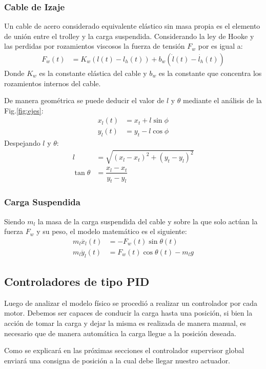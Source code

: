 \documentclass[journal]{IEEEtran}
\begin{document}
\subsubsection{Cable de Izaje}
Un cable de acero considerado equivalente elástico sin masa
propia es el elemento de unión entre el trolley y la carga
suspendida. Considerando la ley de Hooke y 
las perdidas por rozamientos viscosos la fuerza de tensión 
$F_w$ por es igual a:
\begin{align}
    F_w(t) &= K_w (l(t)-l_h(t)) + b_w(\dot{l}(t)-\dot{l_h}(t))
\end{align}
Donde $K_w$ es la constante elástica del cable y $b_w$ es la
constante que concentra los rozamientos internos del cable.

De manera geométrica se puede deducir el valor de $l$ y $\theta$ 
mediante el análisis de la Fig.\ref{fig:ejes}:
\begin{align}
    x_l(t) &=  x_t + l \sin \phi \\
    y_l(t) &=  y_t - l \cos \phi 
\end{align}
Despejando $l$ y $\theta$:
\begin{align}
    l &= \sqrt{(x_l - x_t)^2 + (y_t - y_l)^2} \\
    \tan \theta &= \dfrac{x_l - x_t}{y_t - y_l}
\end{align}

\subsubsection{Carga Suspendida}
Siendo $m_l$ la masa de la carga suspendida del cable
y sobre la que solo actúan la fuerza $F_w$ y
su peso, el modelo matemático es el siguiente:
\begin{align}
    m_l \ddot{x_l}(t) &=  -F_w(t) \sin \theta(t) \\
    m_l \ddot{y_l}(t) &=  F_w(t) \cos \theta(t) - m_l g 
\end{align}


\subsection{Controladores de tipo PID}
Luego de analizar el modelo físico se procedió a realizar un controlador por cada motor.
Debemos ser capaces de conducir la carga hasta una posición, si bien la acción de 
tomar la carga y dejar la misma es realizada de manera manual, es necesario que de manera
automática la carga llegue a la posición deseada. 

Como se explicará en las próximas secciones el controlador supervisor global enviará
una consigna de posición a la cual debe llegar nuestro actuador.
\end{document}
